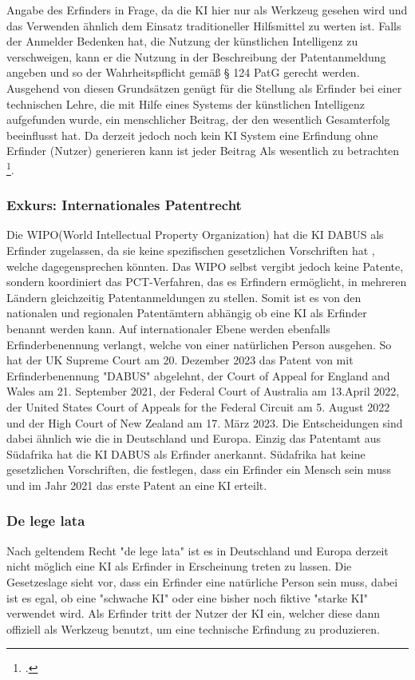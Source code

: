 Angabe des Erfinders in Frage, da die KI hier nur als 
Werkzeug gesehen wird und das Verwenden ähnlich dem 
Einsatz traditioneller Hilfsmittel zu werten ist.
Falls der Anmelder Bedenken hat, 
die Nutzung der künstlichen Intelligenz zu verschweigen, 
kann er die Nutzung in der Beschreibung der Patentanmeldung angeben 
und so der Wahrheitspflicht gemäß § 124 PatG gerecht werden.
Ausgehend von diesen Grundsätzen genügt 
für die Stellung als Erfinder bei einer technischen Lehre, 
die mit Hilfe eines Systems der künstlichen
Intelligenz aufgefunden wurde, 
ein menschlicher Beitrag, 
der den wesentlich Gesamterfolg beeinflusst hat. 
Da derzeit jedoch noch kein KI System eine Erfindung ohne
Erfinder (Nutzer) generieren kann ist jeder Beitrag Als
wesentlich zu betrachten \footcite{zivilsenatZB222024}.
\\

\subsubsection{Exkurs: Internationales Patentrecht\label{sec:intp}}
Die WIPO(World Intellectual Property Organization) 
hat die KI DABUS als Erfinder zugelassen,
da sie keine spezifischen gesetzlichen Vorschriften hat
, welche dagegensprechen könnten. 
Das WIPO
selbst vergibt jedoch keine Patente, 
sondern koordiniert das PCT-Verfahren, 
das es Erfindern ermöglicht, 
in mehreren Ländern gleichzeitig 
Patentanmeldungen zu stellen. 
Somit ist es
von den nationalen und regionalen Patentämtern abhängig
ob eine KI als Erfinder benannt werden kann.
Auf internationaler Ebene werden ebenfalls Erfinderbenennung verlangt,
welche von einer natürlichen Person ausgehen. So hat 
der UK Supreme Court am 20. Dezember 2023 das Patent von mit 
Erfinderbenennung "DABUS" abgelehnt, der Court of Appeal for England
and Wales am 21. September 2021,
der Federal Court of Australia am 13.April 2022,
der United States Court of Appeals for the
Federal Circuit am 5. August 2022 
und  der High Court of New
Zealand am 17. März 2023.
Die Entscheidungen sind dabei ähnlich wie die 
in Deutschland und Europa.
Einzig das Patentamt aus 
Südafrika hat die KI DABUS als Erfinder anerkannt.
Südafrika hat keine gesetzlichen Vorschriften, 
die festlegen, 
dass ein Erfinder ein Mensch sein muss und im Jahr 2021 das
erste Patent an eine KI erteilt.


\subsubsection{De lege lata}
Nach geltendem Recht "de lege lata" ist es in Deutschland und Europa
derzeit nicht möglich eine KI 
als Erfinder in Erscheinung treten zu lassen.
Die Gesetzeslage sieht vor, 
dass ein Erfinder eine natürliche Person sein muss,
dabei ist es egal, ob eine "schwache KI" oder eine 
bisher noch fiktive "starke KI" verwendet wird.
Als Erfinder tritt der Nutzer der KI ein, 
welcher diese dann offiziell
als Werkzeug benutzt,
um eine technische Erfindung zu produzieren.


